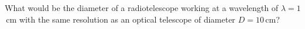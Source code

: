 What would be the diameter of a radiotelescope working at a wavelength of
$\lambda = 1$\,cm with the same resolution as an optical telescope of diameter
$D = 10$\,cm?
